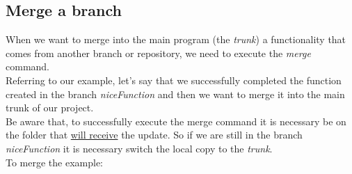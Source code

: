 \subsection{Merge a branch}
\label{subsection:shellMergeBranch}

When we want to merge into the main program (the \textit{trunk}) a functionality that comes from another branch or repository, we need to execute the \textit{merge} command.\\


Referring to our example, let's say that we successfully completed the function created in the branch \textit{niceFunction} and then we want to merge it into the main trunk of our project. \\

Be aware that, to successfully execute the merge command it is necessary be on the folder that \underline{will receive} the update. So if we are still in the branch \textit{niceFunction} it is necessary switch the local copy to the \textit{trunk}.\\

To merge the example:

